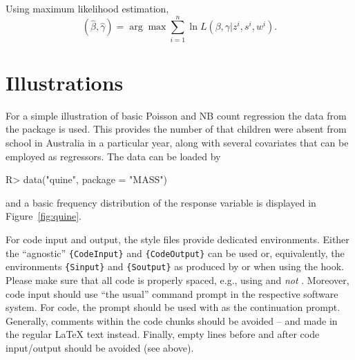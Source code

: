 \documentclass[article]{jss}
\newcommand{\fct}[1]{\code{#1()}}
\begin{document}
Using maximum likelihood estimation,
\begin{equation}
  (\widehat\beta,\widehat\gamma) = \arg\max\sum_{i=1}^n\ln L(\beta,\gamma|z^i,s^i,w^i).
\end{equation}


\section{Illustrations} \label{sec:illustrations}

For a simple illustration of basic Poisson and NB count regression the
 data from the  package is used. This provides the number
of  that children were absent from school in Australia in a
particular year, along with several covariates that can be employed as regressors.
The data can be loaded by
%
\begin{CodeChunk}
\begin{CodeInput}
R> data("quine", package = "MASS")
\end{CodeInput}
\end{CodeChunk}
%
and a basic frequency distribution of the response variable is displayed in
Figure~\ref{fig:quine}.

\begin{leftbar}
For code input and output, the style files provide dedicated environments.
Either the ``agnostic'' \verb|{CodeInput}| and \verb|{CodeOutput}| can be used
or, equivalently, the environments \verb|{Sinput}| and \verb|{Soutput}| as
produced by \fct{Sweave} or  when using the 
hook. Please make sure that all code is properly spaced, e.g., using
 and \emph{not} . Moreover, code input should
use ``the usual'' command prompt in the respective software system. For
 code, the prompt  should be used with  as
the continuation prompt. Generally, comments within the code chunks should be
avoided -- and made in the regular {\LaTeX} text instead. Finally, empty lines
before and after code input/output should be avoided (see above).
\end{leftbar}
\end{document}
